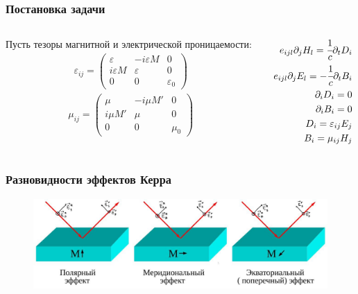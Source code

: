 \documentclass[handout]{beamer}
\newcommand{\eps}{\varepsilon}
\begin{document}
\begin{frame}
    \frametitle{Постановка задачи}
    \begin{columns}
        \begin{column}{0.5\textwidth}
            Пусть тезоры магнитной и электрической проницаемости:
            \begin{gather}
                \eps_{ij} = 
                \begin{pmatrix}
                    \eps& -i\eps M& 0\\
                    i\eps M& \eps& 0\\
                    0& 0& \eps_0
                \end{pmatrix}
            \end{gather}
            \begin{gather}
                \mu_{ij} = 
                \begin{pmatrix}
                    \mu& -i\mu M'& 0\\
                    i\mu M'& \mu& 0\\
                    0& 0& \mu_0
                \end{pmatrix}
            \end{gather}
        \end{column}

        \begin{column}{0.5\textwidth}
            \begin{eqnarray}
                \label{eq_max_1}
                e_{ijl} \partial_j H_l = \cfrac{1}{c} \partial_t D_i\\
                \label{eq_max_2}
                e_{ijl} \partial_j E_l = -\cfrac{1}{c} \partial_t B_i\\
                \label{eq_max_3}
                \partial_i D_i = 0\\
                \partial_i B_i = 0\\
                D_i = \eps_{ij} E_j\\
                B_i = \mu_{ij} H_j
            \end{eqnarray}
        \end{column}
      \end{columns}
\end{frame}


\begin{frame}
    \frametitle{Разновидности эффектов Керра}
    \begin{figure}[h]
        \centering
        \includegraphics[width=1\textwidth]{kerr__.jpg}
    \end{figure}
\end{frame}
\end{document}
